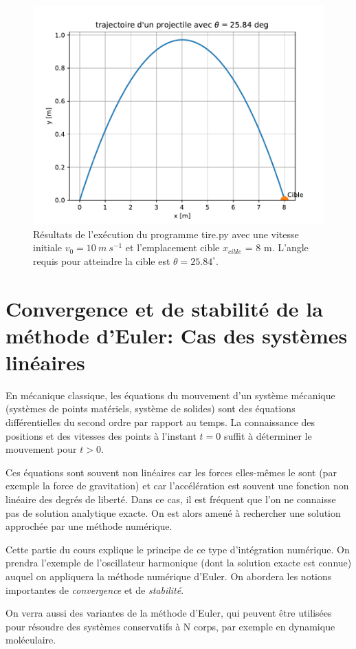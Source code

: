 \documentclass[%
oneside,                 %
final,                   %
10pt]{article}
\begin{document}
\begin{figure}[!ht]  %
  \centerline{\includegraphics[width=0.7\linewidth]{scripts/tire.pdf}}
  \caption{
  Résultats de l'exécution du programme tire.py avec une vitesse initiale $v_0 = 10 \ m \ s^{−1}$ et l'emplacement cible $x_{cible}$ = 8 m. L'angle requis pour atteindre la cible est $\theta = 25.84^\circ$. \label{fig:tire}
  }
\end{figure}


\section{Convergence et de stabilité de la méthode d'Euler: Cas des systèmes linéaires}
En mécanique classique, les équations du mouvement d'un système mécanique (systèmes de points matériels, système de solides) sont des équations différentielles du second ordre par rapport au temps. La connaissance des positions et des vitesses des points à l'instant $t=0$ suffit à déterminer le mouvement pour $t>0$.

Ces équations sont souvent non linéaires car les forces elles-mêmes le sont (par exemple la force de gravitation) et car l'accélération est souvent une fonction non linéaire des degrés de liberté. Dans ce cas, il est fréquent que l'on ne connaisse pas de solution analytique exacte. On est alors amené à rechercher une solution approchée par une méthode numérique.

Cette partie du cours explique le principe de ce type d'intégration numérique. On prendra l'exemple de l'oscillateur harmonique (dont la solution exacte est connue) auquel on appliquera la méthode numérique d'Euler. On abordera les notions importantes de \emph{convergence} et de \emph{stabilité}.

On verra aussi des variantes de la méthode d'Euler, qui peuvent être utilisées pour résoudre des systèmes conservatifs à N corps, par exemple en dynamique moléculaire.
\end{document}
